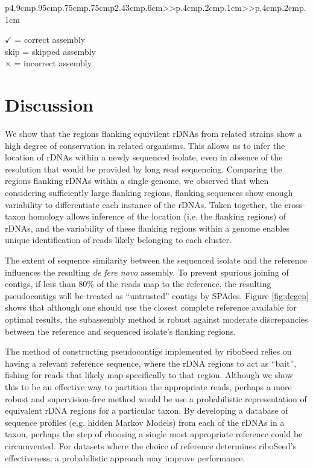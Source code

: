 \documentclass[10pt]{article}
\begin{document}
\begin{linenumbers}
\begin{table}[!h]
{\begin{tabular}{p{4.9cm}p{.95cm}p{.75cm}p{.75cm}p{2.43cm}p{.6cm}>{\color{black}}>{\hfill}p{.4cm}p{.2cm}p{.1cm}>{\color{black}}>{\hfill}p{.4cm}p{.2cm}p{.1cm}}
    \bottomrule
    \begin{minipage}[t]{.5\textwidth}
      {\tiny
        $\checkmark$ = correct assembly \\ skip = skipped assembly \\ $\times$ = incorrect assembly
      }
    \end{minipage}
  \end{tabular}
  }
\end{table}

\section*{Discussion}
We show that the regions flanking equivilent rDNAs from related strains show a high degree of conservation in related organisms. This allows us to infer the location of rDNAs within a newly sequenced isolate, even in absence of the resolution that would be provided by long read sequencing. Comparing the regions flanking rDNAs within a single genome, we observed that when considering sufficiently large flanking regions, flanking sequences show enough variability to differentiate each instance of the rDNAs. Taken together, the cross-taxon homology allows inference of the location (i.e. the flanking regions) of rDNAs, and the variability of these flanking regions within a genome enables unique identification of reads likely belonging to each cluster.

The extent of sequence similarity between the sequenced isolate and the reference influences the resulting \textit{de fere novo} assembly. To prevent spurious joining of contigs, if less than 80\% of the reads map to the reference, the resulting pseudocontigs will be treated as ``untrusted'' contigs by SPAdes. Figure \ref{fig:degen} shows that although one should use the closest complete reference available for optimal results, the subassembly method is robust against moderate discrepancies between the reference and sequenced isolate's flanking regions.

The method of constructing pseudocontigs implemented by riboSeed relies on having a relevant reference sequence, where the rDNA regions to act as ``bait'', fishing for reads that likely map specifically to that region. Although we show this to be an effective way to partition the appropriate reads, perhaps a more robust and supervision-free method would be use a probabilistic representation of equivalent rDNA regions for a particular taxon. By developing a database of sequence profiles (e.g. hidden Markov Models) from each of the rDNAs in a taxon, perhaps the step of choosing a single most appropriate reference could be circumvented. For datasets where the choice of reference determines riboSeed's effectiveness, a probabilistic approach may improve performance.


\end{linenumbers}
\end{document}
